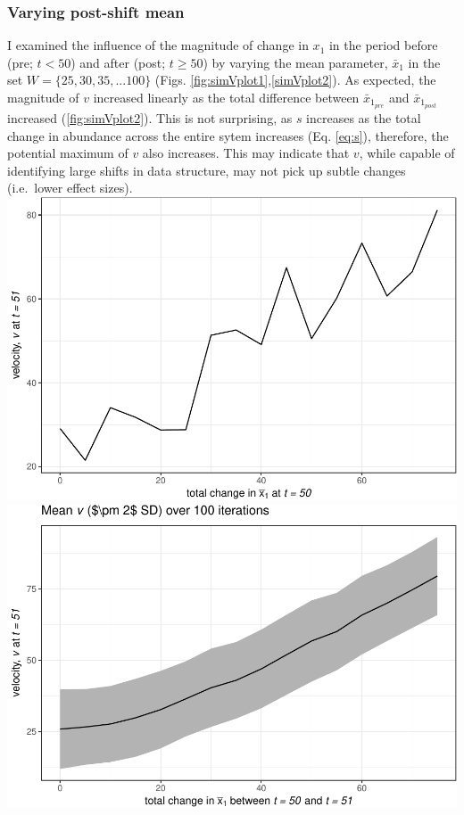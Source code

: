 \documentclass[12pt,twoside,openany]{reedthesis}
\begin{document}
\subsubsection{Varying post-shift mean}\label{varying-post-shift-mean}

I examined the influence of the magnitude of change in \(x_1\) in the
period before (pre; \(t <50\)) and after (post; \(t \geq 50\)) by
varying the mean parameter, \(\bar{x}_1\) in the set
\(W=\{25,30,35,...100 \}\) (Figs. \ref{fig:simVplot1},\ref{simVplot2}).
As expected, the magnitude of \(v\) increased linearly as the total
difference between \(\bar{x}_{1_{pre}}\) and \(\bar{x}_{1_{post}}\)
increased (\ref{fig:simVplot2}). This is not surprising, as \(s\)
increases as the total change in abundance across the entire sytem
increases (Eq. \eqref{eq:s}), therefore, the potential maximum of \(v\)
also increases. This may indicate that \(v\), while capable of
identifying large shifts in data structure, may not pick up subtle
changes (i.e.~lower effect sizes).
\includegraphics{_myDissertation_files/figure-latex/simVplot1-1.pdf}
\includegraphics{_myDissertation_files/figure-latex/simVplot2-1.pdf}
\end{document}
